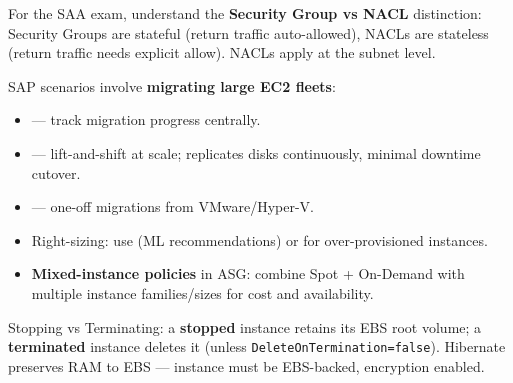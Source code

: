 \begin{saadepth}
For the SAA exam, understand the \textbf{Security Group vs NACL} distinction:
Security Groups are stateful (return traffic auto-allowed), NACLs are stateless
(return traffic needs explicit allow). NACLs apply at the subnet level.
\end{saadepth}

\begin{sapdepth}
SAP scenarios involve \textbf{migrating large EC2 fleets}:
\begin{itemize}
  \item {} — track migration progress centrally.
  \item {} — lift-and-shift at scale;
        replicates disks continuously, minimal downtime cutover.
  \item {} — one-off migrations from VMware/Hyper-V.
  \item Right-sizing: use  (ML recommendations)
        or  for over-provisioned instances.
  \item \textbf{Mixed-instance policies} in ASG: combine Spot + On-Demand with
        multiple instance families/sizes for cost and availability.
\end{itemize}
\end{sapdepth}

\begin{gotcha}
Stopping vs Terminating: a \textbf{stopped} instance retains its EBS root volume;
a \textbf{terminated} instance deletes it (unless \texttt{DeleteOnTermination=false}).
Hibernate preserves RAM to EBS — instance must be EBS-backed, encryption enabled.
\end{gotcha}
